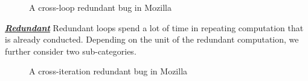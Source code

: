 \begin{figure}
\caption{A cross-loop redundant bug in Mozilla}
\label{fig:Mozilla477564}
\end{figure}


\underline{\textit{\textbf{Redundant}}}
Redundant loops spend a lot of time in repeating computation that is already
conducted.
Depending on the unit of the redundant computation, we further consider 
two sub-categories.


\begin{figure}
\caption{A cross-iteration redundant bug in Mozilla}
\label{fig:Mozilla490742}
\end{figure}



